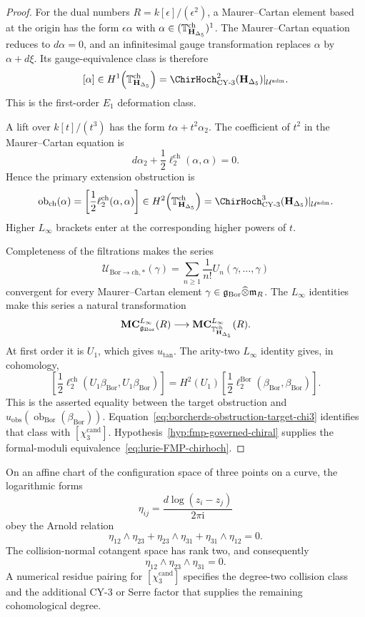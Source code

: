 \begin{proof}
For the dual numbers \(R=k[\epsilon]/(\epsilon^2)\), a
Maurer--Cartan element based at the origin has the form
\(\epsilon\alpha\) with
\(\alpha\in(\mathbb T_{\mathbf H_{\Delta_5}}^{\mathrm{ch}})^1\).
The Maurer--Cartan equation reduces to \(d\alpha=0\), and an
infinitesimal gauge transformation replaces \(\alpha\) by
\(\alpha+d\xi\).  Its gauge-equivalence class is therefore
\[
 [\alpha]\in
 H^1\!\left(\TangCplx_{\mathbf H_{\Delta_5}}^{\mathrm{ch}}\right)
 =
 \ChirHoch^2_{\mathrm{CY\text{-}3}}
 (\mathbf H_{\Delta_5})|_{\Uadm}.
\]
This is the first-order \(E_1\) deformation class.

A lift over \(k[t]/(t^3)\) has the form
\(t\alpha+t^2\alpha_2\).  The coefficient of \(t^2\) in the
Maurer--Cartan equation is
\[
 d\alpha_2+\frac12\ell^{\mathrm{ch}}_2(\alpha,\alpha)=0.
\]
Hence the primary extension obstruction is
\[
 \operatorname{ob}_{\mathrm{ch}}(\alpha)
 =
 \left[\frac12\ell^{\mathrm{ch}}_2(\alpha,\alpha)\right]
 \in
 H^2\!\left(\TangCplx_{\mathbf H_{\Delta_5}}^{\mathrm{ch}}\right)
 =
 \ChirHoch^3_{\mathrm{CY\text{-}3}}
 (\mathbf H_{\Delta_5})|_{\Uadm}.
\]
Higher \(L_\infty\) brackets enter at the corresponding higher powers
of \(t\).

Completeness of the filtrations makes the series
\[
 \mathcal U_{\mathrm{Bor}\to\mathrm{ch},*}(\gamma)
 =
 \sum_{n\geq1}\frac1{n!}U_n(\gamma,\ldots,\gamma)
\]
convergent for every Maurer--Cartan element
\(\gamma\in\mathfrak g_{\mathrm{Bor}}\widehat\otimes\mathfrak m_R\).  The \(L_\infty\)
identities make this series a natural transformation
\[
 \mathbf{MC}^{L_\infty}_{\mathfrak g_{\mathrm{Bor}}}(R)\longrightarrow
 \mathbf{MC}^{L_\infty}_{\mathbb T_{\mathbf H_{\Delta_5}}^{\mathrm{ch}}}(R).
\]
At first order it is \(U_1\), which gives \(u_{\mathrm{tan}}\).
The arity-two \(L_\infty\) identity gives, in cohomology,
\[
 \left[\frac12\ell^{\mathrm{ch}}_2
   (U_1\beta_{\mathrm{Bor}},U_1\beta_{\mathrm{Bor}})\right]
 =
 H^2(U_1)\left[
   \frac12\ell^{\mathrm{Bor}}_2
   (\beta_{\mathrm{Bor}},\beta_{\mathrm{Bor}})\right].
\]
This is the asserted equality between the target obstruction and
\(u_{\mathrm{obs}}(\operatorname{ob}_{\mathrm{Bor}}
(\beta_{\mathrm{Bor}}))\).  Equation~\eqref{eq:borcherds-obstruction-target-chi3}
identifies that class
with \([\chi_3^{\mathrm{cand}}]\).  Hypothesis~\ref{hyp:fmp-governed-chiral} supplies
the formal-moduli equivalence~\eqref{eq:lurie-FMP-chirhoch}.

\end{proof}

\begin{remark}
\label{rem:chi3-collision-degree}
On an affine chart of the configuration space of three points on a
curve, the logarithmic forms
\[
 \eta_{ij}=\frac{d\log(z_i-z_j)}{2\pi\mathrm i}
\]
obey the Arnold relation
\[
 \eta_{12}\wedge\eta_{23}
 +\eta_{23}\wedge\eta_{31}
 +\eta_{31}\wedge\eta_{12}=0.
\]
The collision-normal cotangent space has rank two, and consequently
\[
 \eta_{12}\wedge\eta_{23}\wedge\eta_{31}=0.
\]
A numerical residue pairing for \([\chi_3^{\mathrm{cand}}]\) specifies the
degree-two collision class and the additional CY-$3$ or Serre factor
that supplies the remaining cohomological degree.
\end{remark}

